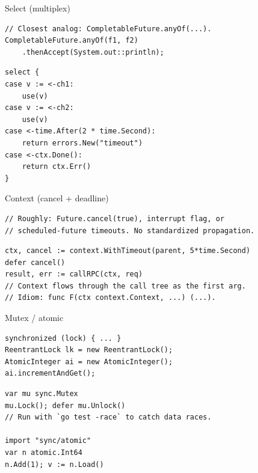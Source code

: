 \documentclass[10pt]{article}
\begin{document}
\begin{construct}{Select (multiplex)}
\noindent
\begin{minipage}[t]{0.485\linewidth}
\begin{lstlisting}[style=java, title=Java]
// Closest analog: CompletableFuture.anyOf(...).
CompletableFuture.anyOf(f1, f2)
    .thenAccept(System.out::println);
\end{lstlisting}
\end{minipage}\hfill
\begin{minipage}[t]{0.485\linewidth}
\begin{lstlisting}[style=go, title=Go]
select {
case v := <-ch1:
    use(v)
case v := <-ch2:
    use(v)
case <-time.After(2 * time.Second):
    return errors.New("timeout")
case <-ctx.Done():
    return ctx.Err()
}
\end{lstlisting}
\end{minipage}
\end{construct}

\begin{construct}{Context (cancel + deadline)}
\noindent
\begin{minipage}[t]{0.485\linewidth}
\begin{lstlisting}[style=java, title=Java]
// Roughly: Future.cancel(true), interrupt flag, or
// scheduled-future timeouts. No standardized propagation.
\end{lstlisting}
\end{minipage}\hfill
\begin{minipage}[t]{0.485\linewidth}
\begin{lstlisting}[style=go, title=Go]
ctx, cancel := context.WithTimeout(parent, 5*time.Second)
defer cancel()
result, err := callRPC(ctx, req)
// Context flows through the call tree as the first arg.
// Idiom: func F(ctx context.Context, ...) (...).
\end{lstlisting}
\end{minipage}
\end{construct}

\begin{construct}{Mutex / atomic}
\noindent
\begin{minipage}[t]{0.485\linewidth}
\begin{lstlisting}[style=java, title=Java]
synchronized (lock) { ... }
ReentrantLock lk = new ReentrantLock();
AtomicInteger ai = new AtomicInteger();
ai.incrementAndGet();
\end{lstlisting}
\end{minipage}\hfill
\begin{minipage}[t]{0.485\linewidth}
\begin{lstlisting}[style=go, title=Go]
var mu sync.Mutex
mu.Lock(); defer mu.Unlock()
// Run with `go test -race` to catch data races.

import "sync/atomic"
var n atomic.Int64
n.Add(1); v := n.Load()
\end{lstlisting}
\end{minipage}
\end{construct}
\end{document}

